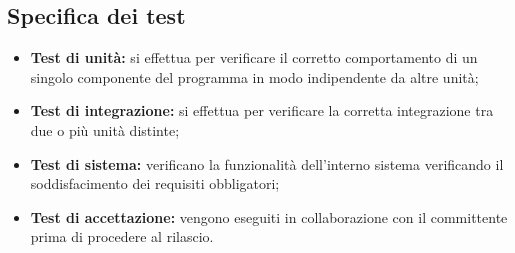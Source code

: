 \subsection{Specifica dei test}
\begin{itemize}
	\item \textbf{Test di unità:} si effettua per verificare il corretto comportamento di un singolo componente del programma in modo indipendente da altre unità;
	\item \textbf{Test di integrazione:} si effettua per verificare la corretta integrazione tra due o più unità distinte;
	\item \textbf{Test di sistema:} verificano la funzionalità dell'interno sistema verificando il soddisfacimento dei requisiti obbligatori;
	\item \textbf{Test di accettazione:} vengono eseguiti in collaborazione con il committente prima di procedere al rilascio.
\end{itemize}
